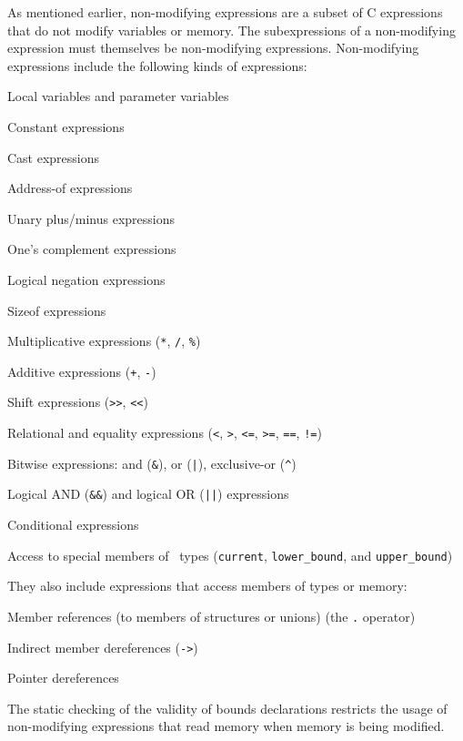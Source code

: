 As mentioned earlier, non-modifying expressions are a subset of C
expressions that do not modify variables or memory. The subexpressions
of a non-modifying expression must themselves be non-modifying
expressions. Non-modifying expressions include the following kinds of
expressions:

\begin{compactitem}
\item
  Local variables and parameter variables
\item
  Constant expressions
\item
  Cast expressions
\item
  Address-of expressions
\item
  Unary plus/minus expressions
\item
  One's complement expressions
\item
  Logical negation expressions
\item
  Sizeof expressions
\item
  Multiplicative expressions (\texttt{*}, \texttt{/}, \texttt{\%})
\item
  Additive expressions (\texttt{+}, \texttt{-})
\item
  Shift expressions (\texttt{>>}, \texttt{<<})
\item
  Relational and equality expressions (\texttt{<}, \texttt{>},
  \texttt{<=}, \texttt{>=}, \texttt{==}, \texttt{!=})
\item
  Bitwise expressions: and (\texttt{\&}), or (\texttt{|}), exclusive-or (\texttt{\^})
\item
  Logical AND (\texttt{\&\&}) and logical OR (\texttt{||}) expressions
\item
  Conditional expressions
\item
  Access to special members of \arrayview\ types
  (\texttt{current}, \texttt{lower\_bound}, and \texttt{upper\_bound})
\end{compactitem}

They also include expressions that access members of types or memory:

\begin{compactitem}
\item
  Member references (to members of structures or unions) (the \texttt{.}
  operator)
\item
  Indirect member dereferences (\texttt{->})
\item
  Pointer dereferences
\end{compactitem}

The static checking of the validity of bounds declarations restricts the
usage of non-modifying expressions that read memory when memory is being
modified.

